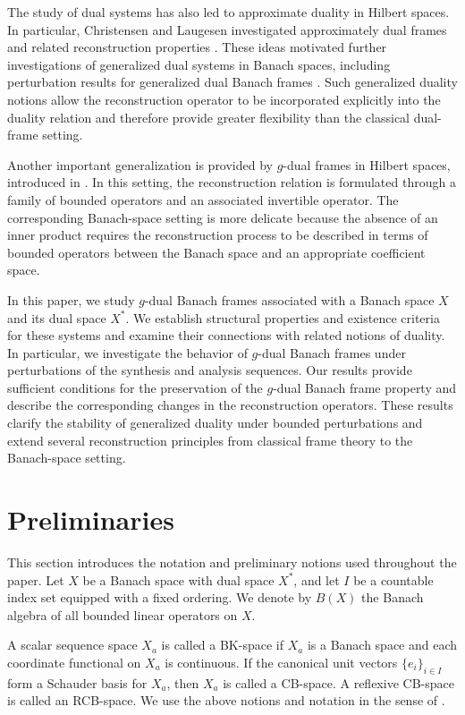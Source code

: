 \documentclass[12pt]{article}
\theoremstyle{definition}
\theoremstyle{remark}
\begin{document}
The study of dual systems has also led to approximate duality in Hilbert
spaces. In particular, Christensen and Laugesen investigated approximately
dual frames and related reconstruction properties
\cite{Christensen2010}. These ideas motivated further investigations of
generalized dual systems in Banach spaces, including perturbation results
for generalized dual Banach frames \cite{Karimizad2014}. Such generalized
duality notions allow the reconstruction operator to be incorporated
explicitly into the duality relation and therefore provide greater
flexibility than the classical dual-frame setting.

Another important generalization is provided by \(g\)-dual frames in
Hilbert spaces, introduced in \cite{Dehghan2013}. In this setting, the
reconstruction relation is formulated through a family of bounded
operators and an associated invertible operator. The corresponding
Banach-space setting is more delicate because the absence of an inner
product requires the reconstruction process to be described in terms of
bounded operators between the Banach space and an appropriate coefficient
space.

In this paper, we study \(g\)-dual Banach frames associated with a Banach
space \(X\) and its dual space \(X^*\). We establish structural properties
and existence criteria for these systems and examine their connections
with related notions of duality. In particular, we investigate the
behavior of \(g\)-dual Banach frames under perturbations of the synthesis
and analysis sequences. Our results provide sufficient conditions for the
preservation of the \(g\)-dual Banach frame property and describe the
corresponding changes in the reconstruction operators. These results
clarify the stability of generalized duality under bounded perturbations
and extend several reconstruction principles from classical frame theory
to the Banach-space setting.

\section{Preliminaries}

This section introduces the notation and preliminary notions used
throughout the paper. Let \(X\) be a Banach space with dual space \(X^*\),
and let \(I\) be a countable index set equipped with a fixed ordering.
We denote by \(B(X)\) the Banach algebra of all bounded linear operators
on \(X\).

A scalar sequence space \(X_a\) is called a BK-space if \(X_a\) is a
Banach space and each coordinate functional on \(X_a\) is continuous.
If the canonical unit vectors \(\{e_i\}_{i\in I}\) form a Schauder basis
for \(X_a\), then \(X_a\) is called a CB-space. A reflexive CB-space is
called an RCB-space. We use the above notions and notation in the sense
of \cite{Karimizad2014}.
\end{document}
